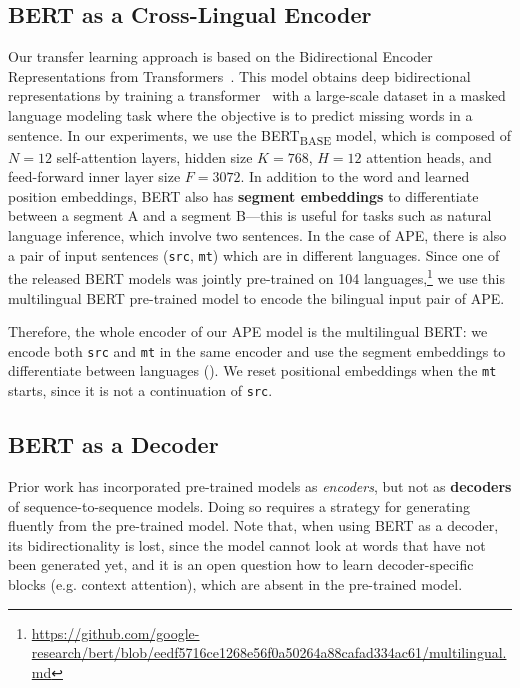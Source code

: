 \subsection{BERT as a Cross-Lingual Encoder}

\noindent Our transfer learning approach is based on the Bidirectional Encoder
Representations from Transformers~\citep[BERT;][]{devlin2018bert}.
This model obtains deep bidirectional representations by training a
transformer~\citep{vaswani2017attention} with a large-scale dataset
in a masked language modeling task where the objective is to predict
missing words in a sentence. In our experiments, we use the BERT\textsubscript{BASE}
model, which is composed of $N\!\!=\!\!12$ self-attention layers, hidden size
$K\!\!=\!\!768$, $H\!\!=\!\!12$ attention heads, and feed-forward inner layer size
$F\!\!=\!\!3072$. In addition to the word and learned position embeddings,
BERT also has {\bf segment embeddings} to differentiate between a
segment A and a segment B---this is useful for tasks such as natural
language inference, which involve two sentences. In the case of APE,
there is also a pair of input sentences ({\tt src}, {\tt mt}) which
are in different languages. Since one of the released BERT models was
jointly pre-trained on 104 languages,\footnote{
    \url{https://github.com/google-research/bert/blob/eedf5716ce1268e56f0a50264a88cafad334ac61/multilingual.md}}
we use this multilingual BERT pre-trained model to encode the
bilingual input pair of APE.

Therefore, the whole encoder of our APE model is the multilingual
BERT: we encode both {\tt src} and {\tt mt} in the same encoder and
use the segment embeddings to differentiate between languages
(). We reset positional
embeddings when the {\tt mt} starts, since it is not a continuation
of {\tt src}.

\subsection{BERT as a Decoder}\label{sec:ape_bert_decoder}

\noindent Prior work has incorporated pre-trained models as {\it encoders}, but
not as {\bf decoders} of sequence-to-sequence models. Doing so
requires a strategy for generating fluently from the pre-trained
model. Note that, when using BERT as a decoder, its bidirectionality is lost, since the
model cannot look at words that have not been generated yet, and it
is an open question how to learn decoder-specific blocks (e.g.
context attention), which are absent in the pre-trained model.

